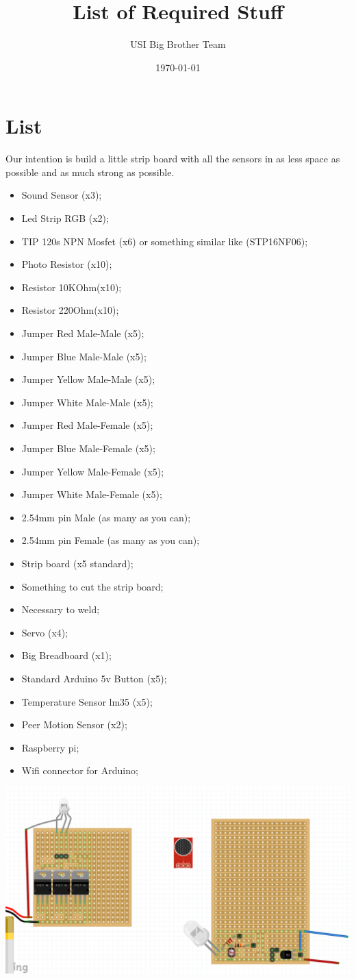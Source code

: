 \documentclass[12pt]{article}
\begin{document}
\title{List of Required Stuff}
\author{USI Big Brother Team}
\date{\today}
\maketitle
\section*{List}
Our intention is build a little strip board with all the sensors in as less space as possible and as much strong as possible.
\begin{itemize}
\item Sound Sensor (x3); \checkmark
\item Led Strip RGB (x2);
\item TIP 120s NPN Mosfet (x6) or something similar like (STP16NF06);
\item Photo Resistor (x10);
\item Resistor 10KOhm(x10);
\item Resistor 220Ohm(x10);
\item Jumper Red Male-Male (x5); \checkmark
\item Jumper Blue Male-Male (x5); \checkmark
\item Jumper Yellow Male-Male (x5); \checkmark
\item Jumper White Male-Male (x5); \checkmark
\item Jumper Red Male-Female (x5); \checkmark
\item Jumper Blue Male-Female (x5); \checkmark
\item Jumper Yellow Male-Female (x5); \checkmark
\item Jumper White Male-Female (x5); \checkmark
\item 2.54mm pin Male (as many as you can);
\item 2.54mm pin Female (as many as you can);
\item Strip board (x5 standard);
\item Something to cut the strip board;
\item Necessary to weld;
\item Servo (x4);
\item Big Breadboard (x1); \checkmark
\item Standard Arduino 5v Button (x5);
\item Temperature Sensor lm35 (x5);
\item Peer Motion Sensor (x2); \checkmark
\item Raspberry pi; \checkmark
\item Wifi connector for Arduino; \checkmark

\end{itemize}
\includegraphics[scale=0.5]{stripBoard}
\end{document}

